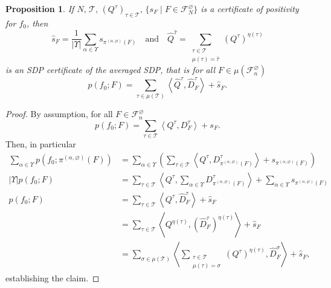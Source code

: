 \documentclass[a4paper,11pt]{article}
\newtheorem{proposition}[theorem]{Proposition}
\numberwithin{equation}{section}
\newcommand{\mF}{\mathcal{F}}
\newcommand{\mT}{\mathcal{T}}
\begin{document}
\begin{proposition}
    \label{thm:color_invariant_sdp}
    If $N, \, \mT, \, (Q^\tau )_{\tau \in \mT}, \, \{ s_F \mid F \in \mF_N^\varnothing \}$ is a certificate of positivity for $f_0$, then
    \[
        \hat{s}_{ F } = \frac{1}{|\Upsilon|}\sum_{\alpha \in \Upsilon} s_{\pi^{(\alpha,\varnothing)}(F)}
    \quad \text{and} \quad
        \hat Q^{\hat \tau} = \sum_{\substack{\tau \in \mT \\ \mu(\tau) = \hat\tau}} (Q^\tau)^{\eta(\tau)}
    \]
    is an SDP certificate of the averaged SDP, that is for all $F \in \mu (\mF_n^\varnothing)$
    \begin{equation} \label{eq:reduced-sdp-1}
        p(f_0; F) = \sum_{\tau \in \mu(\mT)}\left\langle \hat{Q}^{\tau}, \hat{D}_{F }^{\tau } \right\rangle + \hat{s}_{ F }.%
    \end{equation}
\end{proposition}
%
\begin{proof}
By assumption, for all  $F \in \mF_n^\varnothing$
     \begin{equation*}
         p(f_0; F) = \sum_{\tau \in \mT}\left\langle Q^{\tau},   D_{F }^{\tau } \right\rangle + s_{ F }.
    \end{equation*}
    Then, in particular
     \begin{align*}
          \sum_{\alpha \in \Upsilon} p(f_0; \pi^{(\alpha,\varnothing)} (F)) 
          &= \sum_{\alpha \in \Upsilon} \left(\sum_{\tau \in \mT}\left\langle Q^{\tau},   D_{\pi^{(\alpha,\varnothing)} (F) }^{\tau } \right\rangle + s_{ \pi^{(\alpha,\varnothing)} (F) } \right) \\
        |\Upsilon| p(f_0; F) &= \sum_{\tau \in \mT}\left\langle Q^{\tau}, \sum_{\alpha \in \Upsilon}  D_{\pi^{(\alpha,\varnothing)} (F) }^{\tau } \right\rangle + \sum_{\alpha \in \Upsilon} s_{ \pi^{(\alpha,\varnothing)} (F) } \\
        p(f_0; F) &= \sum_{\tau \in \mT}\left\langle Q^{\tau}, \hat{D}_{F }^{\tau } \right\rangle + \hat{s}_{ F } \\
        &= \sum_{\tau \in \mT}\left\langle Q^{\eta(\tau)}, (\hat{D}_{F }^{\tau})^{\eta(\tau)} \right\rangle + \hat{s}_{ F } \\
        &= \sum_{\sigma\in \mu(\mT)}\left\langle 
        \sum_{\substack{\tau \in \mT \\ \mu(\tau) = \sigma}} (Q^\tau)^{\eta(\tau)}, \hat{D}_{F }^{\sigma} \right\rangle + \hat{s}_{ F },
    \end{align*}
    establishing the claim.
\end{proof}
\end{document}
